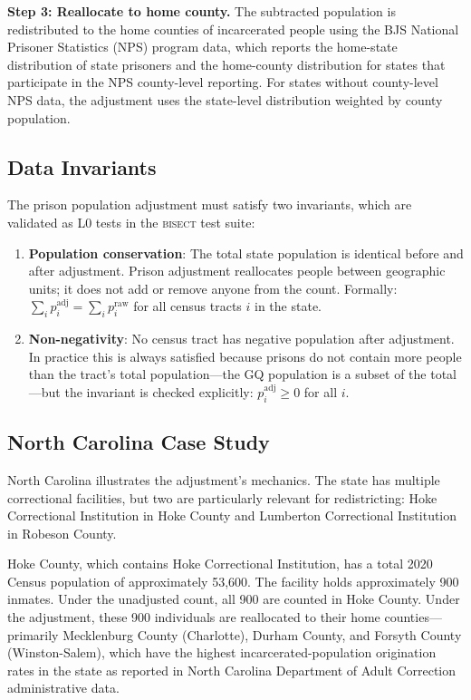 \textbf{Step 3: Reallocate to home county.} The subtracted population is
redistributed to the home counties of incarcerated people using the BJS
National Prisoner Statistics (NPS) program data, which reports the
home-state distribution of state prisoners and the home-county distribution
for states that participate in the NPS county-level reporting. For states
without county-level NPS data, the adjustment uses the state-level
distribution weighted by county population.

\subsection{Data Invariants}

The prison population adjustment must satisfy two invariants, which are
validated as L0 tests in the \textsc{bisect} test suite:

\begin{enumerate}
\item \textbf{Population conservation}: The total state population is
  identical before and after adjustment. Prison adjustment reallocates
  people between geographic units; it does not add or remove anyone from
  the count. Formally: $\sum_i p_i^{\text{adj}} = \sum_i p_i^{\text{raw}}$
  for all census tracts $i$ in the state.

\item \textbf{Non-negativity}: No census tract has negative population
  after adjustment. In practice this is always satisfied because prisons
  do not contain more people than the tract's total population---the GQ
  population is a subset of the total---but the invariant is checked
  explicitly: $p_i^{\text{adj}} \geq 0$ for all $i$.
\end{enumerate}

\subsection{North Carolina Case Study}

North Carolina illustrates the adjustment's mechanics. The state has
multiple correctional facilities, but two are particularly relevant for
redistricting: Hoke Correctional Institution in Hoke County and Lumberton
Correctional Institution in Robeson County.

Hoke County, which contains Hoke Correctional Institution, has a total
2020 Census population of approximately 53,600. The facility holds
approximately 900 inmates. Under the unadjusted count, all 900 are counted
in Hoke County. Under the adjustment, these 900 individuals are reallocated
to their home counties---primarily Mecklenburg County (Charlotte),
Durham County, and Forsyth County (Winston-Salem), which have the highest
incarcerated-population origination rates in the state as reported in
North Carolina Department of Adult Correction administrative data.

